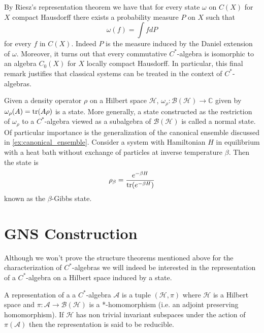 \begin{example}
By Riesz's representation theorem \cite{Hewitt1975} we have that for every state $\omega$ on $C(X)$ for $X$ compact Hausdorff there exists a probability measure $P$ on $X$ such that
\begin{equation}
\omega (f)=\int fdP
\end{equation}    
for every $f$ in $C(X)$. Indeed $P$ is the measure induced by the Daniel extension of $\omega$. Moreover, it turns out that every commutative $C^*$-algebra is isomorphic to an algebra $C_0(X)$ for $X$ locally compact Hausdorff\cite{Bratteli1997}. In particular, this final remark justifies that classical systems can be treated in the context of $C^*$-algebras. 
\end{example}

\begin{example}\label{ex:Gibbs}
Given a density operator $\rho$ on a Hilbert space $\mathcal{H}$, $\omega_\rho:\mathcal{B} (\mathcal{H})\rightarrow\mathbb{C}$ given by $\omega_\rho(A)=\operatorname{tr}(A\rho)$ is a state. More generally, a state constructed as the restriction of $\omega_\rho$ to a $C^*$-algebra viewed as a subalgebra of $\mathcal{B}(\mathcal{H})$ is called a normal state. Of particular importance is the generalization of the canonical ensemble discussed in \ref{ex:canonical_ensemble}. Consider a system with Hamiltonian $H$ in equilibrium with a heat bath without exchange of particles at inverse temperature $\beta$. Then the state is
\begin{equation}
\rho_\beta=\frac{e^{-\beta H}}{\operatorname{tr}(e^{-\beta H})}
\end{equation}
known as the $\beta$-Gibbs state\cite{Kubo1965}\cite{Duvenhage1999}. 
\end{example}

\section{GNS Construction}

Although we won't prove the structure theorems mentioned above for the characterization of $C^*$-algebras we will indeed be interested in the representation of a $C^*$-algebra on a Hilbert space induced by a state. 

\begin{definition}
A representation of a a $C^*$-algebra $\mathcal{A}$ is a tuple $(\mathcal{H},\pi)$ where $\mathcal{H}$ is a Hilbert space and $\pi:\mathcal{A}\rightarrow \mathcal{B}(\mathcal{H})$ is a *-homomorphism (i.e. an adjoint preserving homomorphism). If $\mathcal{H}$ has non trivial invariant subspaces under the action of $\pi(\mathcal{A})$ then the representation is said to be reducible.
\end{definition}

